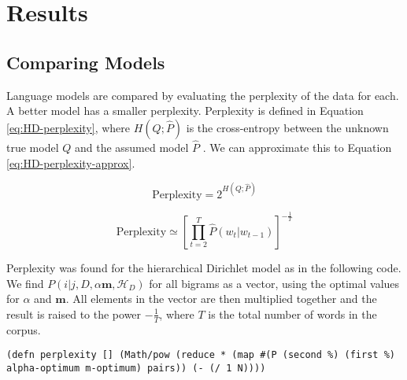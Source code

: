 \chapter{Results}

\section{Comparing Models}

Language models are compared by evaluating the perplexity of the data for each. A better model has a smaller perplexity. Perplexity is defined in Equation \ref{eq:HD-perplexity}, where $H(Q;\hat{P})$ is the cross-entropy between the unknown true model $Q$ and the assumed model $\hat{P}$ \cite{mackay1995hierarchical}. We can approximate this to Equation \ref{eq:HD-perplexity-approx}.

\begin{equation}
\text{Perplexity}=2^{H(Q;\hat{P})}
\label{eq:HD-perplexity}
\end{equation}

\begin{equation}
\text{Perplexity}\simeq\left[\prod_{t=2}^{T}\hat{P}(w_{t}|w_{t-1})\right]^{-\frac{1}{T}}
\label{eq:HD-perplexity-approx}
\end{equation}

Perplexity was found for the hierarchical Dirichlet model as in the following code. We find $P(i|j,D,\alpha\boldsymbol{m},\mathscr{H}_{D})$ for all bigrams as a vector, using the optimal values for $\alpha$ and $\boldsymbol{m}$. All elements in the vector are then multiplied together and the result is raised to the power $-\frac{1}{T}$, where $T$ is the total number of words in the corpus.

\begin{lstlisting}
(defn perplexity [] (Math/pow (reduce * (map #(P (second %) (first %) alpha-optimum m-optimum) pairs)) (- (/ 1 N))))
\end{lstlisting}

